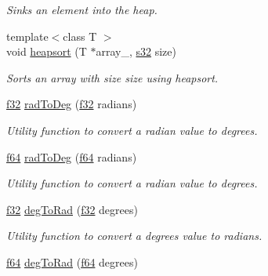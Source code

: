 \begin{DoxyCompactItemize}
\begin{DoxyCompactList}\small\item\em Sinks an element into the heap. \end{DoxyCompactList}\item 
{\footnotesize template$<$class T $>$ }\\void \hyperlink{namespaceirr_1_1core_aee38facdb42325b97626099d72f9a872}{heapsort} (T $\ast$array\+\_\+, \hyperlink{namespaceirr_ac66849b7a6ed16e30ebede579f9b47c6}{s32} size)\hypertarget{namespaceirr_1_1core_aee38facdb42325b97626099d72f9a872}{}\label{namespaceirr_1_1core_aee38facdb42325b97626099d72f9a872}

\begin{DoxyCompactList}\small\item\em Sorts an array with size \textquotesingle{}size\textquotesingle{} using heapsort. \end{DoxyCompactList}\item 
\hyperlink{namespaceirr_a0277be98d67dc26ff93b1a6a1d086b07}{f32} \hyperlink{namespaceirr_1_1core_a8deb22ad77fb8ead3f6683bbf9ad3f67}{rad\+To\+Deg} (\hyperlink{namespaceirr_a0277be98d67dc26ff93b1a6a1d086b07}{f32} radians)
\begin{DoxyCompactList}\small\item\em Utility function to convert a radian value to degrees. \end{DoxyCompactList}\item 
\hyperlink{namespaceirr_a1325b02603ad449f92c68fc640af9b28}{f64} \hyperlink{namespaceirr_1_1core_aab39939b1518daee0967c368a3bf924a}{rad\+To\+Deg} (\hyperlink{namespaceirr_a1325b02603ad449f92c68fc640af9b28}{f64} radians)
\begin{DoxyCompactList}\small\item\em Utility function to convert a radian value to degrees. \end{DoxyCompactList}\item 
\hyperlink{namespaceirr_a0277be98d67dc26ff93b1a6a1d086b07}{f32} \hyperlink{namespaceirr_1_1core_ad58b3d0e755a4f25ad19d5f5d4fb0280}{deg\+To\+Rad} (\hyperlink{namespaceirr_a0277be98d67dc26ff93b1a6a1d086b07}{f32} degrees)
\begin{DoxyCompactList}\small\item\em Utility function to convert a degrees value to radians. \end{DoxyCompactList}\item 
\hyperlink{namespaceirr_a1325b02603ad449f92c68fc640af9b28}{f64} \hyperlink{namespaceirr_1_1core_a2def535b4f391ceb86ec0497cbb4bf80}{deg\+To\+Rad} (\hyperlink{namespaceirr_a1325b02603ad449f92c68fc640af9b28}{f64} degrees)

\end{DoxyCompactItemize}
